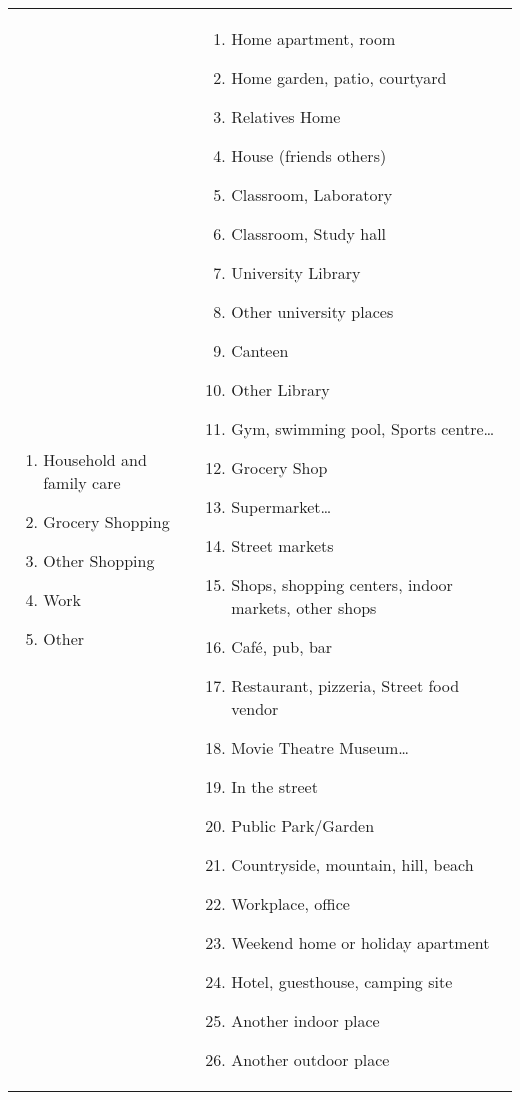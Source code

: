 \begin{tabularx}{0.97\textwidth}{p{8cm}X}
\begin{enumerate}[leftmargin=*]
        \item Household and family care
        \item Grocery Shopping
        \item Other Shopping
        \item Work
        \item Other
    \end{enumerate}&
    \begin{enumerate}[leftmargin=*]
        \item Home apartment, room
        \item Home garden, patio, courtyard
        \item Relatives Home
        \item House (friends others)
        \item Classroom, Laboratory
        \item Classroom, Study hall
        \item University Library
        \item Other university places
        \item Canteen
        \item Other Library
        \item Gym, swimming pool, Sports centre\ldots
        \item Grocery Shop
        \item Supermarket\ldots
        \item Street markets
        \item Shops, shopping centers, indoor markets, other shops
        \item Café, pub, bar
        \item Restaurant, pizzeria, Street food vendor
        \item Movie Theatre Museum\ldots
        \item In the street
        \item Public Park/Garden
        \item Countryside, mountain, hill, beach
        \item Workplace, office
        \item Weekend home or holiday apartment
        \item Hotel, guesthouse, camping site
        \item Another indoor place
        \item Another outdoor place
    \end{enumerate} \\

\end{tabularx}
